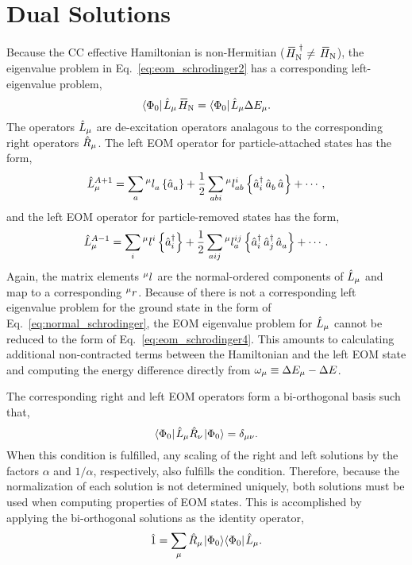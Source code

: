 \documentclass[thesis.tex]{subfiles}
\begin{document}
\section{Dual Solutions} \label{section:eom_dual}

Because the CC effective Hamiltonian is non-Hermitian ($\EHamN^{\dagger} \neq \EHamN$), the eigenvalue problem in Eq.\ \eqref{eq:eom_schrodinger2} has a corresponding left-eigenvalue problem,
\begin{equation} \label{eq:eom_dual1}
  \refbra\Lop_{\mu}\EHamN = \refbra\Lop_{\mu}\Ecorr_{\mu}.
\end{equation}
The operators $\hat{L}\hspace{-0.1pt}_{\mu}$ are de-excitation operators analagous to the corresponding right operators $\hat{R}\hspace{-0.1pt}_{\mu}$.  The left EOM operator for particle-attached states has the form,
\begin{equation}
  \hat{L}\hspace{-0.1pt}^{A+1}_{\mu} = \sum_{a}{}^{\mu}l^{\hspace{0.1pt}}_{a}\left\{\mathop{\hat{a}^{}_{a}}\right\} + \frac{1}{2}\sum_{abi}{}^{\mu}l^{\hspace{0.1pt}i}_{ab}\left\{\mathop{\hat{a}^{\dagger}_{i}}\mathop{\hat{a}^{}_{b}}\mathop{\hat{a}^{}_{}}\right\} + \cdots,
\end{equation}
and the left EOM operator for particle-removed states has the form,
\begin{equation}
  \hat{L}\hspace{-0.1pt}^{A-1}_{\mu} = \sum_{i}{}^{\mu}l^{\hspace{0.1pt}i}_{}\left\{\mathop{\hat{a}^{\dagger}_{i}}\right\} + \frac{1}{2}\sum_{aij}{}^{\mu}l^{\hspace{0.1pt}ij}_{a}\left\{\mathop{\hat{a}^{\dagger}_{i}}\mathop{\hat{a}^{\dagger}_{j}}\mathop{\hat{a}^{}_{a}}\right\} + \cdots.
\end{equation}
Again, the matrix elements ${}^{\mu}l^{\hspace{0.1pt}}_{}$ are the normal-ordered components of $\hat{L}\hspace{-0.1pt}_{\mu}$ and map to a corresponding ${}^{\mu}r^{}_{}$.  Because of there is not a corresponding left eigenvalue problem for the ground state in the form of Eq.\ \eqref{eq:normal_schrodinger}, the EOM eigenvalue problem for $\hat{L}\hspace{-0.1pt}_{\mu}$ cannot be reduced to the form of Eq.\ \eqref{eq:eom_schrodinger4}.  This amounts to calculating additional non-contracted terms between the Hamiltonian and the left EOM state and computing the energy difference directly from $\omega_{\mu} \equiv \Delta E_{\mu} - \Delta E$.

The corresponding right and left EOM operators form a bi-orthogonal basis such that,
\begin{equation}
  \langle \Phi_{0} |\hspace{1pt}\hat{L}\hspace{-0.1pt}_{\mu}\hat{R}\hspace{-0.1pt}_{\nu}\hspace{1pt}\lvert \Phi_{0} \rangle = \delta_{\mu\nu}.
\end{equation}
When this condition is fulfilled, any scaling of the right and left solutions by the factors $\alpha$ and $1/\alpha$, respectively, also fulfills the condition.  Therefore, because the normalization of each solution is not determined uniquely, both solutions must be used when computing properties of EOM states.  This is accomplished by applying the bi-orthogonal solutions as the identity operator,
\begin{gather}
  \hat{1} = \sum_{\mu} \hat{R}\hspace{-0.1pt}_{\mu}\hspace{1pt}\lvert \Phi_{0} \rangle\langle \Phi_{0} |\hspace{1pt}\hat{L}\hspace{-0.1pt}_{\mu}.
\end{gather}
\end{document}
